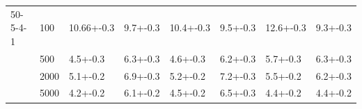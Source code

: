 \begin{table}[]
\begin{tabular}{llllllll}
50-5-4-1   & 100     & 10.66+-0.3      & \cellcolor{lightgray}9.7+-0.3     & 10.4+-0.3  & \cellcolor{lightgray}9.5+-0.3 & 12.6+-0.3 & \cellcolor{lightgray}9.3+-0.3   \\
		   & 500     & \cellcolor{lightgray}4.5+-0.3      & 6.3+-0.3     & \cellcolor{lightgray}4.6+-0.3  & 6.2+-0.3 & 5.7+-0.3 & 6.3+-0.3 \\
           & 2000    & \cellcolor{lightgray}5.1+-0.2      & 6.9+-0.3     & \cellcolor{lightgray}5.2+-0.2  & 7.2+-0.3 & \cellcolor{lightgray}5.5+-0.2 & 6.2+-0.3 \\
           & 5000    & \cellcolor{lightgray}4.2+-0.2      & 6.1+-0.2     & \cellcolor{lightgray}4.5+-0.2  & 6.5+-0.3 & \cellcolor{lightgray}4.4+-0.2 & \cellcolor{lightgray}4.4+-0.2 \\ \hline
\end{tabular}
\end{table}

